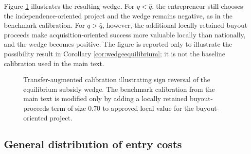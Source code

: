 Figure \ref{fig:wedge_sign_reversal_appendix} illustrates the resulting wedge.
For $q<\hat q$, the entrepreneur still chooses the independence-oriented project and the wedge remains negative, as in the benchmark calibration.
For $q>\hat q$, however, the additional locally retained buyout proceeds make acquisition-oriented success more valuable locally than nationally, and the wedge becomes positive.
The figure is reported only to illustrate the possibility result in Corollary \ref{cor:wedgeequilibrium}; it is not the baseline calibration used in the main text.

\begin{figure}[t]
\centering
{}
\caption{Transfer-augmented calibration illustrating sign reversal of the equilibrium subsidy wedge. The benchmark calibration from the main text is modified only by adding a locally retained buyout-proceeds term of size $0.70$ to approved local value for the buyout-oriented project.}
\label{fig:wedge_sign_reversal_appendix}
\end{figure}

\subsection{General distribution of entry costs}\label{app:nationalgeneralG}

